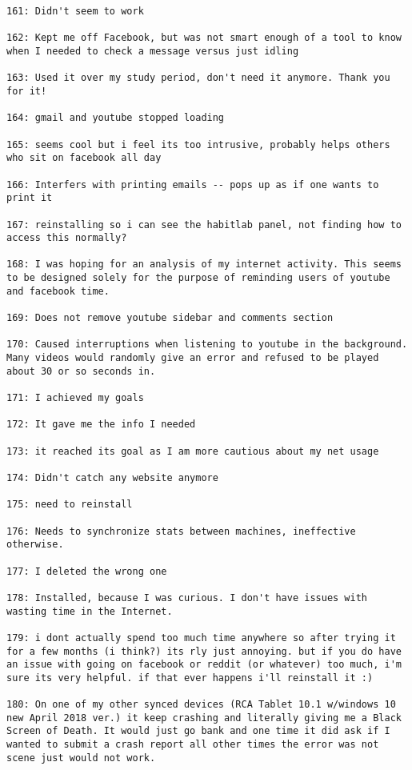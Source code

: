 \begin{lstlisting}[breaklines]
161: Didn't seem to work

162: Kept me off Facebook, but was not smart enough of a tool to know when I needed to check a message versus just idling

163: Used it over my study period, don't need it anymore. Thank you for it!

164: gmail and youtube stopped loading

165: seems cool but i feel its too intrusive, probably helps others who sit on facebook all day

166: Interfers with printing emails -- pops up as if one wants to print it

167: reinstalling so i can see the habitlab panel, not finding how to access this normally?

168: I was hoping for an analysis of my internet activity. This seems to be designed solely for the purpose of reminding users of youtube and facebook time.

169: Does not remove youtube sidebar and comments section

170: Caused interruptions when listening to youtube in the background. Many videos would randomly give an error and refused to be played about 30 or so seconds in.

171: I achieved my goals

172: It gave me the info I needed

173: it reached its goal as I am more cautious about my net usage

174: Didn't catch any website anymore

175: need to reinstall

176: Needs to synchronize stats between machines, ineffective otherwise.

177: I deleted the wrong one

178: Installed, because I was curious. I don't have issues with wasting time in the Internet.

179: i dont actually spend too much time anywhere so after trying it for a few months (i think?) its rly just annoying. but if you do have an issue with going on facebook or reddit (or whatever) too much, i'm sure its very helpful. if that ever happens i'll reinstall it :)

180: On one of my other synced devices (RCA Tablet 10.1 w/windows 10 new April 2018 ver.) it keep crashing and literally giving me a Black Screen of Death. It would just go bank and one time it did ask if I wanted to submit a crash report all other times the error was not scene just would not work.


\end{lstlisting}

